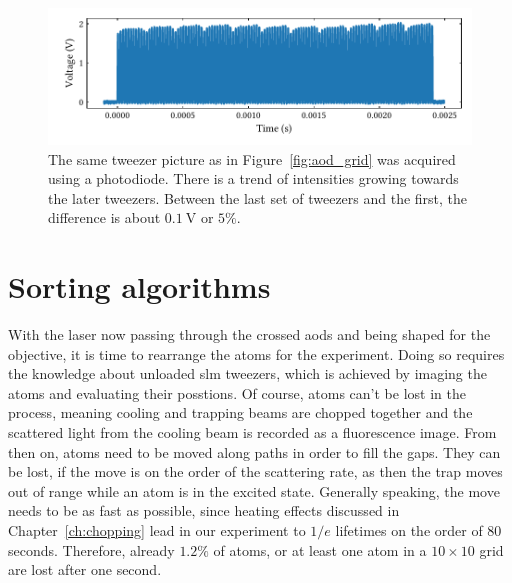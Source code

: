 \begin{figure}[t]%
\centering
\includegraphics{figures/aod_hom_155.pdf}
\caption{The same tweezer picture as in Figure~\ref{fig:aod_grid} was acquired using a photodiode. There is a trend of intensities growing towards the later tweezers. Between the last set of tweezers and the first, the difference is about $\SI{0.1}{\volt}$ or $5\%$.}%
\label{fig:aod_hom}
\end{figure}

\section{Sorting algorithms}

With the laser now passing through the crossed \acp{aod} and being shaped for the objective, it is time to rearrange the atoms for the experiment. Doing so requires the knowledge about unloaded \ac{slm} tweezers, which is achieved by imaging the atoms and evaluating their posstions. Of course, atoms can't be lost in the process, meaning cooling and trapping beams are chopped together and the scattered light from the cooling beam is recorded as a fluorescence image. From then on, atoms need to be moved along paths in order to fill the gaps. They can be lost, if the move is on the order of the scattering rate, as then the trap moves out of range while an atom is in the excited state. Generally speaking, the move needs to be as fast as possible, since heating effects discussed in Chapter~\ref{ch:chopping} lead in our experiment to $1/e$ lifetimes on the order of 80 seconds. Therefore, already $1.2\%$ of atoms, or at least one atom in a $10\times10$ grid are lost after one second.

